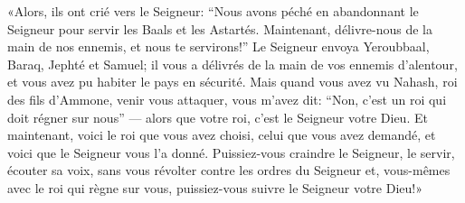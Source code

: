 «Alors, ils ont crié vers le Seigneur:
	“Nous avons péché en abandonnant le Seigneur pour servir les Baals et les Astartés.
	Maintenant, délivre-nous de la main de nos ennemis, et nous te servirons!”
Le Seigneur envoya Yeroubbaal, Baraq, Jephté et Samuel;
	il vous a délivrés de la main de vos ennemis d’alentour,
	et vous avez pu habiter le pays en sécurité.
Mais quand vous avez vu Nahash, roi des fils d’Ammone, venir vous attaquer,
	vous m’avez dit: “Non, c’est un roi qui doit régner sur nous”
	--- alors que votre roi, c’est le Seigneur votre Dieu.
Et maintenant, voici le roi que vous avez choisi, celui que vous avez demandé,
	et voici que le Seigneur vous l’a donné.
Puissiez-vous craindre le Seigneur, le servir, écouter sa voix,
	sans vous révolter contre les ordres du Seigneur
	et, vous-mêmes avec le roi qui règne sur vous,
	puissiez-vous suivre le Seigneur votre Dieu!»
